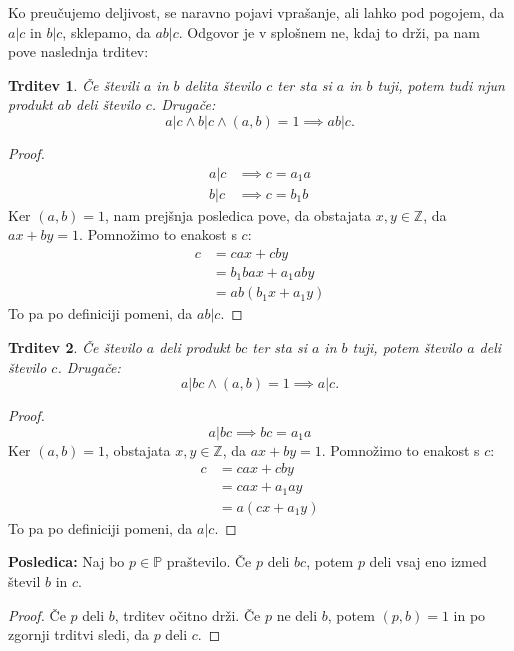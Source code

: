 \documentclass[12pt, a4paper]{article}
\newtheorem{trd}{Trditev}
\newenvironment{posl}[1][]{\par\medskip\noindent \textbf{Posledica: }}{\medskip}
\begin{document}
Ko preučujemo deljivost, se naravno pojavi vprašanje, ali lahko pod pogojem, da $a|c$ in $b|c$, sklepamo, da $ab|c$. Odgovor je v splošnem ne, kdaj to drži, pa nam pove naslednja trditev:

\begin{trd}
Če števili $a$ in $b$ delita število $c$ ter sta si $a$ in $b$ tuji, potem tudi njun produkt $ab$ deli število $c$. Drugače:
$$a|c \land b|c \land (a,b)=1\implies ab|c.$$
\end{trd}

\begin{proof}
\begin{align*}
a|c &\implies c=a_1 a \\
b|c &\implies c=b_1 b
\end{align*}
Ker $(a,b)=1$, nam prejšnja posledica pove, da obstajata $x,y\in \mathbb{Z}$, da $ax+by=1$. Pomnožimo to enakost s $c$:
\begin{align*}
c&=cax + cby \\
&=b_1 bax + a_1 aby \\
&=ab(b_1 x + a_1 y)
\end{align*}
To pa po definiciji pomeni, da $ab|c$.
\end{proof}
 
\begin{trd}
Če število $a$ deli produkt $bc$ ter sta si $a$ in $b$ tuji, potem število $a$ deli število $c$. Drugače:
$$a|bc \land (a,b)=1\implies a|c.$$
\end{trd}

\begin{proof}
$$a|bc \implies bc=a_1 a$$
Ker $(a,b)=1$, obstajata $x,y\in \mathbb{Z}$, da $ax+by=1$. Pomnožimo to enakost s $c$:
\begin{align*}
c&=cax + cby \\
&=cax + a_1 ay \\
&=a(cx + a_1 y)
\end{align*}
To pa po definiciji pomeni, da $a|c$.
\end{proof}

\begin{posl}
Naj bo $p\in \mathbb{P}$ praštevilo. Če $p$ deli $bc$, potem $p$ deli vsaj eno izmed števil $b$ in $c$.
\end{posl}

\begin{proof}
Če $p$ deli $b$, trditev očitno drži. Če $p$ ne deli $b$, potem $(p,b)=1$ in po zgornji trditvi sledi, da $p$ deli $c$.
\end{proof}
\end{document}
